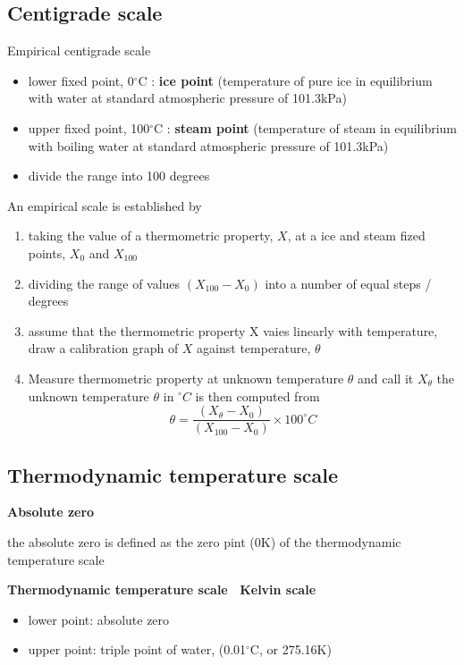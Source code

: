 \documentclass[a4paper, 10pt]{article}
\begin{document}
\subsection{Centigrade scale}
Empirical centigrade scale 
\begin{itemize}
   \item lower fixed point, 0$^{\circ}$C : \textbf{ice point} (temperature of pure ice in equilibrium with water at standard atmospheric pressure of 101.3kPa)
   \item upper fixed point, 100$^{\circ}$C : \textbf{steam point} (temperature of steam in equilibrium with boiling water at standard atmospheric pressure of 101.3kPa)
   \item divide the range into 100 degrees
\end{itemize}	

An empirical scale is established by
\begin{enumerate}
   \item taking the value of a thermometric property, $X$, at a ice and steam fized points, $X_0$  and $X_{100}$ 
   \item dividing the range of values $(X_{100} - X_0)$ into a number of equal steps / degrees
   \item assume that the thermometric property X vaies linearly with temperature, draw a calibration graph of $X$ against temperature, $\theta$ 
   \item Measure thermometric property at unknown temperature $\theta$ and call it $X_{\theta}$ the unknown temperature $\theta$ in $^{\circ}C$ is then computed from 
      \[
         \theta = \frac{(X_{\theta}- X_0)}{(X_{100} - X_0)} \times 100^{\circ} C
      \]
\end{enumerate}	

\subsection{Thermodynamic temperature scale}
\textbf{Absolute zero}
\begin{framed}
   the absolute zero is defined as the zero pint (0K) of the thermodynamic temperature scale
\end{framed}

\textbf{Thermodynamic temperature scale \ Kelvin scale}
\begin{itemize}
   \item lower point: absolute zero
   \item upper point: triple point of water, (0.01$^{\circ}$C, or 275.16K)
\end{itemize}	
\end{document}
